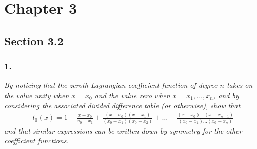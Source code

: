 \documentclass[12pt]{article}
\begin{document}
\section*{Chapter 3}

\subsection*{Section 3.2}

\subsubsection*{1.}

{\it By noticing that the zeroth Lagrangian coefficient function of degree $n$ takes on the value unity when $x = x_0$ and the value zero when $x = x_1, \dots, x_n$, and by considering the associated divided difference table (or otherwise), show that}
\begin{align}
\label{problem_3.2.1a}
l_0(x) = 1 + \frac{x - x_0}{x_0 - x_1} + \frac{(x - x_0)(x - x_1)}{(x_0 - x_1)(x_0 - x_2)} + \dots + \frac{(x - x_0)\dots(x - x_{n-1})}{(x_0 - x_1)\dots(x_0 - x_n)}
\end{align}
{\it and that similar expressions can be written down by symmetry for the other coefficient functions.} \\
\end{document}
